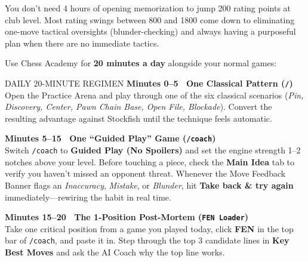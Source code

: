 \documentclass[10pt,twoside]{article}
\begin{document}
You don't need 4 hours of opening memorization to jump 200 rating points at club level. Most rating swings between 800 and 1800 come down to eliminating one-move tactical oversights (blunder-checking) and always having a purposeful plan when there are no immediate tactics.

Use Chess Academy for \textbf{20 minutes a day} alongside your normal games:

\begin{supplementbox}{DAILY 20-MINUTE REGIMEN}
\footnotesize
\textbf{Minutes 0--5 \textbar\ One Classical Pattern (\texttt{/})}\\[2pt]
Open the Practice Arena and play through one of the six classical scenarios (\emph{Pin, Discovery, Center, Pawn Chain Base, Open File, Blockade}). Convert the resulting advantage against Stockfish until the technique feels automatic.

\vspace{4pt}
\textbf{Minutes 5--15 \textbar\ One ``Guided Play'' Game (\texttt{/coach})}\\[2pt]
Switch \texttt{/coach} to \textbf{Guided Play (No Spoilers)} and set the engine strength 1--2 notches above your level. Before touching a piece, check the \textbf{Main Idea} tab to verify you haven't missed an opponent threat. Whenever the Move Feedback Banner flags an \emph{Inaccuracy}, \emph{Mistake}, or \emph{Blunder}, hit \textbf{Take back \& try again} immediately---rewiring the habit in real time.

\vspace{4pt}
\textbf{Minutes 15--20 \textbar\ The 1-Position Post-Mortem (\texttt{FEN Loader})}\\[2pt]
Take one critical position from a game you played today, click \textbf{FEN} in the top bar of \texttt{/coach}, and paste it in. Step through the top 3 candidate lines in \textbf{Key Best Moves} and ask the AI Coach why the top line works.
\end{supplementbox}

\vspace{2pt}
\end{document}
